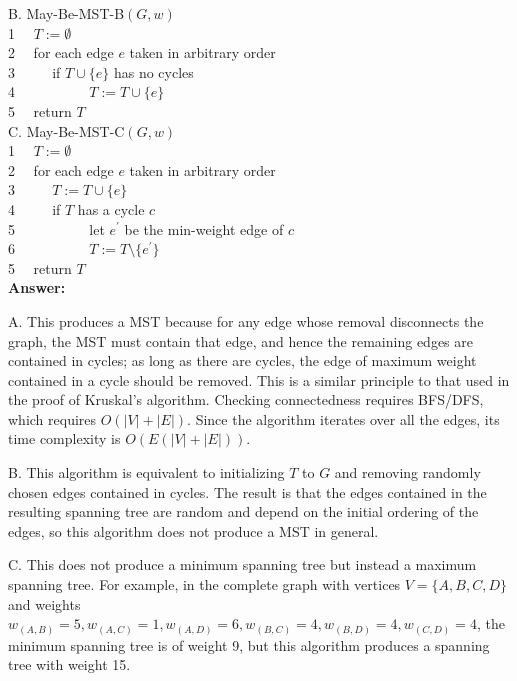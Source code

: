 \documentclass[a4paper,11pt]{article}
\begin{document}
\noindent
B. May-Be-MST-B$(G,w)$\\
1 $~~~$ $T:= \emptyset$ \\
2 $~~~$ for each edge $e$ taken in arbitrary order\\
3 $~~~~~~~~~$ if $T \cup \{ e \}$ has no cycles\\
4 $~~~~~~~~~~~~~~~~~~~~~$ $T := T \cup \{ e \}$\\
5 $~~~$ return $T$\\

\noindent
C. May-Be-MST-C$(G,w)$\\
1 $~~~$ $T:= \emptyset$ \\
2 $~~~$ for each edge $e$ taken in arbitrary order\\
3 $~~~~~~~~~$ $T:=T\cup \{ e \}$\\
4 $~~~~~~~~~$ if $T$ has a cycle $c$\\
5 $~~~~~~~~~~~~~~~~~~~~~$ let $e^\prime$ be the min-weight edge of $c$\\
6 $~~~~~~~~~~~~~~~~~~~~~$ $T:=T \setminus \{ e^\prime \}$\\
5 $~~~$ return $T$\\

\noindent
{\bf Answer:} \par
    A. This produces a MST because for any edge whose removal disconnects the graph, the MST must contain that edge, and hence the remaining edges are contained in cycles; as long as there are cycles, the edge of maximum weight contained in a cycle should be removed. This is a similar principle to that used in the proof of Kruskal's algorithm. Checking connectedness requires BFS/DFS, which requires $O(|V| + |E|)$. Since the algorithm iterates over all the edges, its time complexity is $O(E(|V| + |E|))$. \par
    B. This algorithm is equivalent to initializing $T$ to $G$ and removing randomly chosen edges contained in cycles. The result is that the edges contained in the resulting spanning tree are random and depend on the initial ordering of the edges, so this algorithm does not produce a MST in general. \par
    C. This does not produce a minimum spanning tree but instead a maximum spanning tree. For example, in the complete graph with vertices $V = \{ A, B, C, D \}$ and weights $w_{(A, B)} = 5, w_{(A, C)} = 1, w_{(A, D)} = 6, w_{(B, C)} = 4, w_{(B, D)} = 4, w_{(C, D)} = 4$, the minimum spanning tree is of weight 9, but this algorithm produces a spanning tree with weight 15.
\end{document}
